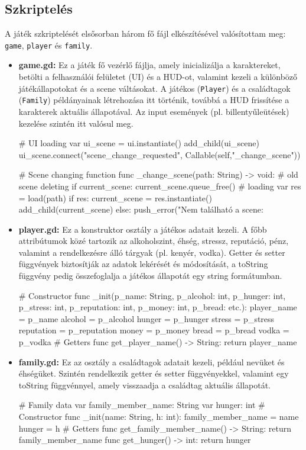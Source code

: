 \documentclass[12pt,a4paper]{article}
\begin{document}
\subsection{Szkriptelés}

A játék szkriptelését elsősorban három fő fájl elkészítésével valósítottam meg: \texttt{game}, \texttt{player} és \texttt{family}.

\begin{itemize}
    \item \textbf{game.gd:} Ez a játék fő vezérlő fájlja, amely inicializálja a karaktereket, betölti a felhasználói felületet (UI) és a HUD-ot, valamint kezeli a különböző játékállapotokat és a scene váltásokat. A játékos (\texttt{Player}) és a családtagok (\texttt{Family}) példányainak létrehozása itt történik, továbbá a HUD frissítése a karakterek aktuális állapotával. Az input események (pl. billentyűleütések) kezelése szintén itt valósul meg.
    \begin{python}
    # UI loading
	var ui_scene = ui.instantiate()
	add_child(ui_scene)
	ui_scene.connect("scene_change_requested",
    Callable(self,"_change_scene"))

    # Scene changing function
    func _change_scene(path: String) -> void:
	   # old scene deleting
	   if current_scene:
		  current_scene.queue_free()
	   # loading
	   var res = load(path)
	   if res:
		  current_scene = res.instantiate()
		  add_child(current_scene)
	   else:
		  push_error("Nem található a scene: %
    \end{python}
    \item \textbf{player.gd:} Ez a konstruktor osztály a játékos adatait kezeli. A főbb attribútumok közé tartozik az alkoholszint, éhség, stressz, reputáció, pénz, valamint a rendelkezésre álló tárgyak (pl. kenyér, vodka). Getter és setter függvények biztosítják az adatok lekérését és módosítását, a toString függvény pedig összefoglalja a játékos állapotát egy string formátumban.
    \begin{python}
    # Constructor
    func _init(p_name: String, p_alcohol: int, p_hunger: int,
    p_stress: int, p_reputation: int, p_money: int, p_bread: etc.):
    	player_name = p_name
    	alcohol = p_alcohol
    	hunger = p_hunger
    	stress = p_stress
    	reputation = p_reputation
    	money = p_money
    	bread = p_bread
    	vodka = p_vodka
    # Getters
    func get_player_name() -> String:
	   return player_name
    \end{python}
    \item \textbf{family.gd:} Ez az osztály a családtagok adatait kezeli, például nevüket és éhségüket. Szintén rendelkezik getter és setter függvényekkel, valamint egy toString függvénnyel, amely visszaadja a családtag aktuális állapotát.
    \begin{python}
    # Family data
    var family_member_name: String
    var hunger: int
    # Constructor
    func _init(name: String, h: int):
	   family_member_name = name
	   hunger = h
    # Getters
    func get_family_member_name() -> String:
	   return family_member_name
    func get_hunger() -> int:
	   return hunger
    \end{python}
\end{itemize}
\end{document}
